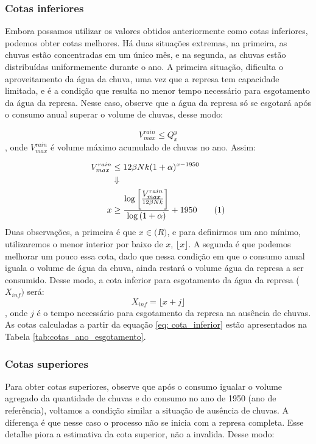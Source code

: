\documentclass{article}
\newcommand\numberthis{\addtocounter{equation}{1}\tag{\theequation}}
\begin{document}
\subsubsection*{Cotas inferiores}

Embora possamos utilizar os valores obtidos anteriormente como cotas inferiores, podemos obter cotas melhores. Há duas situações extremas, na primeira, as chuvas estão concentradas em um único mês, e na segunda, as chuvas estão distribuídas uniformemente durante o ano. A primeira situação, dificulta o aproveitamento da água da chuva, uma vez que a represa tem capacidade limitada, e é a condição que resulta no menor tempo necessário para esgotamento da água da represa. Nesse caso, observe que a água da represa só se esgotará após o consumo anual superar o volume de chuvas, desse modo:

\begin{equation}
    V_{max}^{rain} \leq Q_x^y
\end{equation},
onde $V_{max}^{rain}$ é volume máximo acumulado de chuvas no ano. Assim:

\begin{align*}
     V_{max}^{rain} &\leq 12\beta N k(1 + \alpha)^{x - 1950} \\
                             &\Downarrow \\
    x                        &\geq \frac{\log{\left[ \frac{\displaystyle V_{max}^{rain}}{12\beta Nk}\right]}}{\displaystyle \log{(1 + \alpha)}} + 1950 \numberthis \label{eq: anos_cota_inferior}
\end{align*}
Duas observações, a primeira é que $x \in \mathbb(R)$, e para definirmos um ano mínimo, utilizaremos o menor interior por baixo de $x$, $\lfloor x \rfloor$. A segunda é que podemos melhorar um pouco essa cota, dado que nessa condição em que o consumo anual iguala o volume de água da chuva, ainda restará o volume água da represa a ser consumido. Desse modo, a cota inferior para esgotamento da água da represa ($X_{inf})$ será:
\begin{equation}
\label{eq: cota_inferior}
    X_{inf} = \lfloor x + j  \rfloor
\end{equation},
onde $j$ é o tempo necessário para esgotamento da represa na ausência de chuvas. As cotas calculadas a partir da equação \ref{eq: cota_inferior} estão apresentados na Tabela \ref{tab:cotas_ano_esgotamento}.


\subsubsection*{Cotas superiores}
Para obter cotas superiores, observe que após o consumo igualar o volume agregado da quantidade de chuvas e do consumo no ano de 1950 (ano de referência), voltamos a condição similar a situação de ausência de chuvas. A diferença é que nesse caso o processo não se inicia com a represa completa. Esse detalhe piora a estimativa da cota superior, não a invalida. Desse modo:
\end{document}
